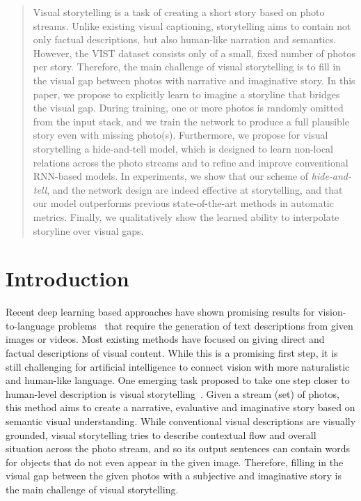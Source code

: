 \documentclass[letterpaper]{article} \usepackage{aaai20}  \usepackage{times}  \usepackage{helvet} \usepackage{courier}  \usepackage[hyphens]{url}  \usepackage{graphicx} \urlstyle{rm} \def\UrlFont{\rm}  \usepackage{graphicx}  \frenchspacing  \setlength{\pdfpagewidth}{8.5in}  \setlength{\pdfpageheight}{11in}
\author{Yunjae Jung\textsuperscript{\rm 1}, Dahun Kim\textsuperscript{\rm 1}, Sanghyun Woo\textsuperscript{\rm 1}, Kyungsu Kim\textsuperscript{\rm 2}, Sungjin Kim\textsuperscript{\rm 2}, In So Kweon\textsuperscript{\rm 1}\\
\textsuperscript{\rm 1}Korea Advanced Institute of Science and Technology (KAIST),  Korea \\
\textsuperscript{\rm 2}Samsung Electronics Co., Ltd (Samsung Research), Korea
}
\begin{document}
\maketitle

\begin{abstract}
Visual storytelling is a task of creating a short story based on photo streams. Unlike existing visual captioning, storytelling aims to contain not only factual descriptions, but also human-like narration and semantics. However, the VIST dataset consists only of a small, fixed number of photos per story. Therefore, the main challenge of visual storytelling is to fill in the visual gap between photos with narrative and imaginative story. In this paper, we propose to explicitly learn to imagine a storyline that bridges the visual gap. During training, one or more photos is randomly omitted from the input stack, and we train the network to produce a full plausible story even with missing photo(s). Furthermore, we propose for visual storytelling a hide-and-tell model, which is designed to learn non-local relations across the photo streams and to refine and improve conventional RNN-based models. In experiments, we show that our scheme of \textit{hide-and-tell}, and the network design are indeed effective at storytelling, and that our model outperforms previous state-of-the-art methods in automatic metrics. Finally, we qualitatively show the learned ability to interpolate storyline over visual gaps.
\end{abstract}


\section{Introduction}
Recent deep learning based approaches have shown promising results for vision-to-language problems~\cite{vinyals2015show,karpathy2015deep,donahue2015long,yu2016video,pan2016hierarchical,gao2017video} that require the generation of text descriptions from given images or videos. Most existing methods have focused on giving direct and factual descriptions of visual content. While this is a promising first step, it is still challenging for artificial intelligence to connect vision with more naturalistic and human-like language. One emerging task proposed to take one step closer to human-level description is visual storytelling~\cite{huang2016visual}. Given a stream (set) of photos, this method aims to create a narrative, evaluative and imaginative story based on semantic visual understanding. While conventional visual descriptions are visually grounded, visual storytelling tries to describe contextual flow and overall situation across the photo stream, and so its output sentences can contain words for objects that do not even appear in the given image. Therefore, filling in the visual gap between the given photos with a subjective and imaginative story is the main challenge of visual storytelling.
\end{document}
